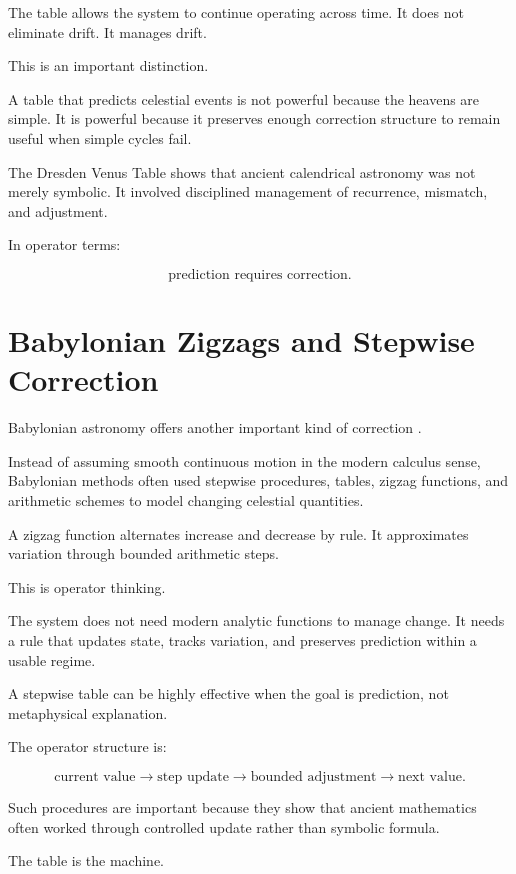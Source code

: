 \documentclass[11pt]{book}
\begin{document}
The table allows the system to continue operating across time. It does not eliminate drift. It manages drift.

This is an important distinction.

A table that predicts celestial events is not powerful because the heavens are simple. It is powerful because it preserves enough correction structure to remain useful when simple cycles fail.

The Dresden Venus Table shows that ancient calendrical astronomy was not merely symbolic. It involved disciplined management of recurrence, mismatch, and adjustment.

In operator terms:

\[
\text{prediction requires correction}.
\]

\section{Babylonian Zigzags and Stepwise Correction}

Babylonian astronomy offers another important kind of correction \cite{Neugebauer1957ExactSciences,HungerPingree1999AstralSciences,Ossendrijver2016AncientBabylonianAstronomers}.

Instead of assuming smooth continuous motion in the modern calculus sense, Babylonian methods often used stepwise procedures, tables, zigzag functions, and arithmetic schemes to model changing celestial quantities.

A zigzag function alternates increase and decrease by rule. It approximates variation through bounded arithmetic steps.

This is operator thinking.

The system does not need modern analytic functions to manage change. It needs a rule that updates state, tracks variation, and preserves prediction within a usable regime.

A stepwise table can be highly effective when the goal is prediction, not metaphysical explanation.

The operator structure is:

\[
\text{current value}
\rightarrow
\text{step update}
\rightarrow
\text{bounded adjustment}
\rightarrow
\text{next value}.
\]

Such procedures are important because they show that ancient mathematics often worked through controlled update rather than symbolic formula.

The table is the machine.
\end{document}
